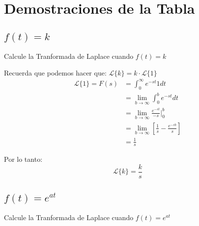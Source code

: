 \documentclass[12pt]{report}                                %
\begin{document}
    \clearpage
    \section{Demostraciones de la Tabla}

        \subsection{$f(t) = k$}
            Calcule la Tranformada de Laplace cuando $f(t) = k$

            Recuerda que podemos hacer que: $\mathscr{L}\{k\} = k \cdot \mathscr{L}\{1\}$
            \begin{equation*}
            \begin{split}
                \mathscr{L}\{1\} = F(s) 
                            & = \int_0^\infty e^{-st} 1 dt                                              \\
                            & = \lim_{b \to \infty} \int_0^b e^{-st} dt                                 \\
                            & = \lim_{b \to \infty} \frac{e^{-st}}{-s} |_0^b                            \\
                            & = \lim_{b \to \infty} \left[ \frac{1}{s} - \frac{e^{-sb}}{s} \right]      \\
                            & = \frac{1}{s}
            \end{split}
            \end{equation*}

            Por lo tanto:
            \begin{equation}   
                \mathscr{L}\{k\} = \frac{k}{s}
            \end{equation}

        \subsection{$f(t) = e^{at}$}
            Calcule la Tranformada de Laplace cuando $f(t) = e^{at}$
\end{document}
